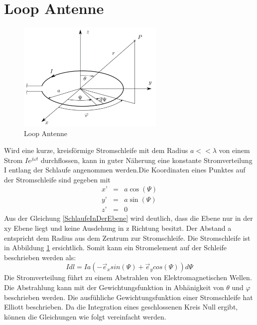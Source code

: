 \newpage
\section{Loop Antenne}\label{sec:LoopAntenneTheorie}
\begin{figure}[h]
	\centering
	\includegraphics[width=7cm]{content/bilder/Loop_EMANT_S45.pdf}%
	\caption{Loop Antenne}
	\label{LoopAntenne}
\end{figure}
Wird eine kurze, kreisförmige Stromschleife mit dem Radius $a<<\lambda$ von einem Strom $Ie^{j\omega t}$ durchflossen,  kann in guter Näherung eine konstante Stromverteilung I entlang der Schlaufe angenommen werden.Die Koordinaten eines Punktes auf der Stromschleife sind gegeben mit
\begin{eqnarray}
x’ &=& a \cos(\Psi)\\
y’ &=& a \sin(\Psi)\\
z’ &=& 0\label{SchlaufeInDerEbene}
\end{eqnarray}
Aus der Gleichung \ref{SchlaufeInDerEbene} wird deutlich, dass die Ebene nur in der xy Ebene liegt und keine Ausdehung in z Richtung besitzt.
Der Abstand  a entspricht dem Radius  aus dem Zentrum zur Stromschleife. Die Stromschleife ist in  Abbildung \ref{LoopAntenne} ersichtlich. Somit kann ein Stromelement auf der Schleife beschrieben werden als:
\begin{equation}
I dl= Ia(- \vec e_{x}sin(\Psi)+\vec e_{y}cos(\Psi))d\Psi
\end{equation}
Die Stromverteilung führt zu einem Abstrahlen von Elektromagnetischen Wellen. Die Abstrahlung kann mit der Gewichtungsfunktion in Abhänigkeit von $\theta$ und $\varphi$ beschrieben werden. Die ausfühliche Gewichtungsfunktion einer Stromschleife hat Elliott \cite{elliott1981antenna}beschrieben. Da die Integration eines geschlossenen Kreis Null ergibt, können die Gleichungen wie folgt vereinfacht werden.

